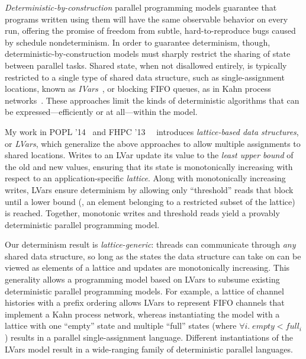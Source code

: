 \documentclass{article}
\begin{document}
\emph{Deterministic-by-construction} parallel programming models
guarantee that programs written using them will have the same
observable behavior on every run, offering the promise of freedom from
subtle, hard-to-reproduce bugs caused by schedule nondeterminism.  In
order to guarantee determinism, though, deterministic-by-construction
models must sharply restrict the sharing of state between parallel
tasks.  Shared state, when not disallowed entirely, is typically
restricted to a single type of shared data structure, such as
single-assignment locations, known as \emph{IVars}~\cite{IStructures,
  CnC}, or blocking FIFO queues, as in Kahn process
networks~\cite{Kahn-1974}.  These approaches limit the kinds of
deterministic algorithms that can be expressed---efficiently or at
all---within the model.

My work in POPL '14~\cite{Freeze-paper, Freeze-TR} and FHPC
'13~~\cite{LVars-paper, LVars-TR} introduces \emph{lattice-based data
  structures}, or \emph{LVars}, which generalize the above approaches
to allow multiple assignments to shared locations.  Writes to an LVar
update its value to the \emph{least upper bound} of the old and new
values, ensuring that its state is monotonically increasing with
respect to an application-specific \emph{lattice}.  Along with
monotonically increasing writes, LVars ensure determinism by allowing
only ``threshold'' reads that block until a lower bound (\ie, an
element belonging to a restricted subset of the lattice) is reached.
Together, monotonic writes and threshold reads yield a provably
deterministic parallel programming model.

Our determinism result is \emph{lattice-generic}: threads can
communicate through \emph{any} shared data structure, so long as the
states the data structure can take on can be viewed as elements of a
lattice and updates are monotonically increasing.  This generality
allows a programming model based on LVars to subsume existing
deterministic parallel programming models.  For example, a lattice of
channel histories with a prefix ordering allows LVars to represent
FIFO channels that implement a Kahn process network, whereas
instantiating the model with a lattice with one ``empty'' state and
multiple ``full'' states (where $\forall{i}.\; \mathit{empty} <
\mathit{full_i}$) results in a parallel single-assignment language.
Different instantiations of the LVars model result in a wide-ranging
family of deterministic parallel languages.
\end{document}
